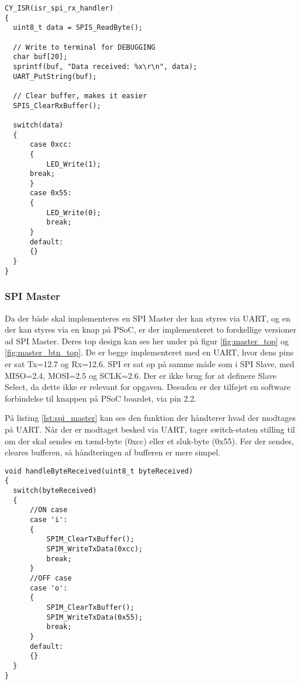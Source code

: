 \documentclass[../main.tex]{subfiles}
\begin{document}
\begin{lstlisting}[caption={SPI Slave}, label=lst:spi_slave]
CY_ISR(isr_spi_rx_handler)
{
  uint8_t data = SPIS_ReadByte();
  
  // Write to terminal for DEBUGGING
  char buf[20];
  sprintf(buf, "Data received: %x\r\n", data);
  UART_PutString(buf);
  
  // Clear buffer, makes it easier
  SPIS_ClearRxBuffer();
  
  switch(data)
  {
      case 0xcc:
      {
          LED_Write(1);
      break;   
      }
      case 0x55:
      {
          LED_Write(0);
          break;
      }
      default:
      {}
  }
}
\end{lstlisting}

\subsubsection{SPI Master}

Da der både skal implementeres en SPI Master der kan styres via UART, og en der kan styres via en knap på PSoC, er der implementeret to forskellige versioner ad SPI Master. Deres top design kan ses her under på figur \ref{fig:master_top} og \ref{fig:master_btn_top}.
De er begge implementeret med en UART, hvor dens pins er sat Tx=12.7 og Rx=12.6. SPI er sat op på samme måde som i SPI Slave, med MISO=2.4, MOSI=2.5 og SCLK=2.6. Der er ikke brug for at definere Slave Select, da dette ikke er relevant for opgaven. Desuden er der tilføjet en software forbindelse til knappen på PSoC boardet, via pin 2.2.



På listing \ref{lst:spi_master} kan ses den funktion der håndterer hvad der modtages på UART. Når der er modtaget besked via UART, tager switch-staten stilling til om der skal sendes en tænd-byte (0xcc) eller et sluk-byte (0x55). Før der sendes, cleares bufferen, så håndteringen af bufferen er mere simpel. 

\begin{lstlisting}[caption={Håndtering af Bytes Received fra UART til SPI Master}, label=lst:spi_master]
void handleByteReceived(uint8_t byteReceived)
{
  switch(byteReceived)
  {
      //ON case
      case 'i': 
      {
          SPIM_ClearTxBuffer();
          SPIM_WriteTxData(0xcc);            
          break;
      }
      //OFF case
      case 'o': 
      {
          SPIM_ClearTxBuffer();
          SPIM_WriteTxData(0x55);
          break;
      }
      default:
      {}
  }
}
\end{lstlisting}
\end{document}
